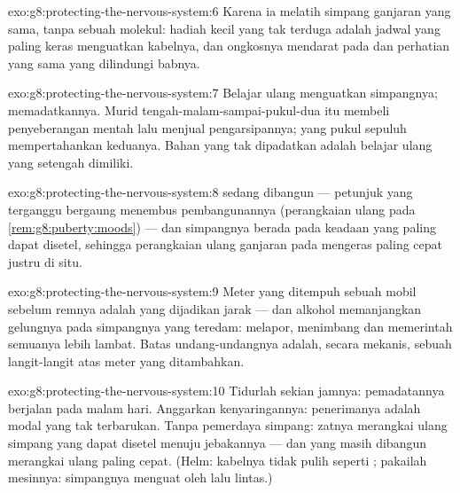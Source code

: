 \begin{solution}{exo:g8:protecting-the-nervous-system:6}
Karena ia melatih simpang ganjaran yang sama, tanpa sebuah
molekul: hadiah kecil yang tak terduga adalah jadwal yang
paling keras menguatkan kabelnya, dan ongkosnya mendarat
pada  dan perhatian yang sama yang dilindungi babnya.
\end{solution}

\begin{solution}{exo:g8:protecting-the-nervous-system:7}
Belajar ulang menguatkan simpangnya;  memadatkannya.
Murid tengah-malam-sampai-pukul-dua itu membeli
penyeberangan mentah lalu menjual pengarsipannya; yang 
pukul sepuluh mempertahankan keduanya. Bahan yang tak
dipadatkan adalah belajar ulang yang setengah dimiliki.
\end{solution}

\begin{solution}{exo:g8:protecting-the-nervous-system:8}
  sedang dibangun --- petunjuk yang terganggu
bergaung menembus pembangunannya (perangkaian ulang pada
\cref{rem:g8:puberty:moods}) --- dan simpangnya berada pada
keadaan yang paling dapat disetel, sehingga perangkaian
ulang ganjaran pada  mengeras paling cepat
justru di situ.
\end{solution}

\begin{solution}{exo:g8:protecting-the-nervous-system:9}
Meter yang ditempuh sebuah mobil sebelum remnya adalah  yang dijadikan jarak --- dan alkohol memanjangkan
gelungnya pada simpangnya yang teredam: melapor, menimbang
dan memerintah semuanya lebih lambat. Batas undang-undangnya
adalah, secara mekanis, sebuah langit-langit atas meter yang
ditambahkan.
\end{solution}

\begin{solution}{exo:g8:protecting-the-nervous-system:10}
Tidurlah sekian jamnya: pemadatannya berjalan pada malam
hari. Anggarkan kenyaringannya: penerimanya adalah modal
yang tak terbarukan. Tanpa pemerdaya simpang: zatnya
merangkai ulang simpang yang dapat disetel menuju jebakannya
--- dan  yang masih dibangun merangkai ulang paling
cepat. (Helm: kabelnya tidak pulih seperti ; pakailah
mesinnya: simpangnya menguat oleh lalu lintas.)
\end{solution}


